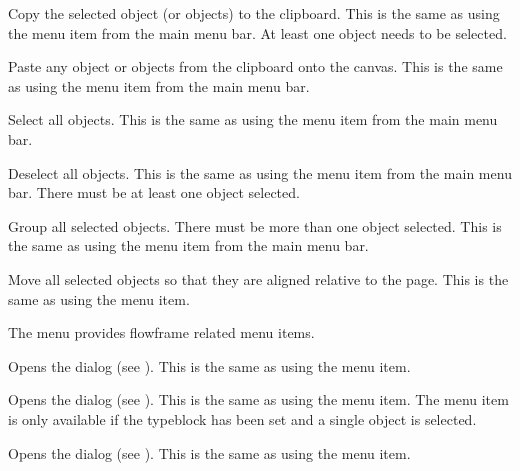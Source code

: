 Copy the selected \gls{object} (or \glspl{object}) to the clipboard.
This is the same as using the  menu item from the
main menu bar. At least one \gls{object} needs to be selected.


Paste any \gls{object} or \glspl{object} from the clipboard onto the
\gls{canvas}.
This is the same as using the  menu item from the
main menu bar.


Select all \glspl{object}.
This is the same as using the  menu item from the
main menu bar.


Deselect all \glspl{object}.
This is the same as using the  menu item from the
main menu bar. There must be at least one \gls{object} selected.


Group all selected \glspl{object}. There must be more than one
object selected.
This is the same as using the  menu item from the
main menu bar.


Move all selected \glspl{object} so that they are aligned relative
to the page.
This is the same as using the  menu item.


The  menu provides \gls{flowframe} related
menu items.

Opens the  dialog (see
). This is the same as using the
 menu item.

Opens the  dialog (see ).
This is the same as using the  menu
item.
The  menu item is only
available if the \gls{typeblock} has been set and a single
object is selected.

Opens the  dialog (see
).
This is the same as using the 
menu item.

